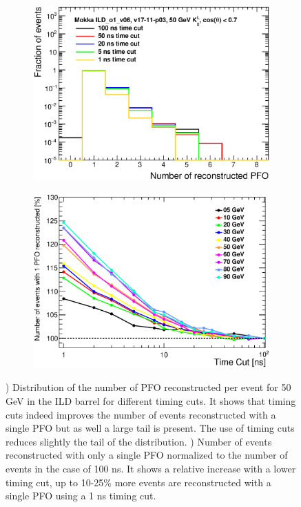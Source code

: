 \begin{figure}[htbp!]
  \centering
  \begin{subfigure}[t]{0.49\textwidth}
    \centering
    \includegraphics[width=1\linewidth]{../Thesis_Plots/ILD/AdditionalPlots/Plots/NumberReconstructedPFO_TimeCuts_50GeV.eps}
    \caption{} \label{fig:DistriPFO}
  \end{subfigure}
  \hfill
  \begin{subfigure}[t]{0.49\textwidth}
    \centering
    \includegraphics[width=1\linewidth]{../Thesis_Plots/ILD/NoSmearing/Plots/NumberEvents_PFO_TimeCuts_noSmearing.eps}
    \caption{} \label{fig:EventRecoPFO}
  \end{subfigure}
  \caption{) Distribution of the number of PFO reconstructed per event for 50 GeV \kzeroL{} in the ILD barrel for different timing cuts. It shows that timing cuts indeed improves the number of events reconstructed with a single PFO but as well a large tail is present. The use of timing cuts reduces slightly the tail of the distribution. ) Number of events reconstructed with only a single PFO normalized to the number of events in the case of 100 ns. It shows a relative increase with a lower timing cut, up to 10-25\% more events are reconstructed with a single PFO using a 1 ns timing cut.}
\end{figure}


